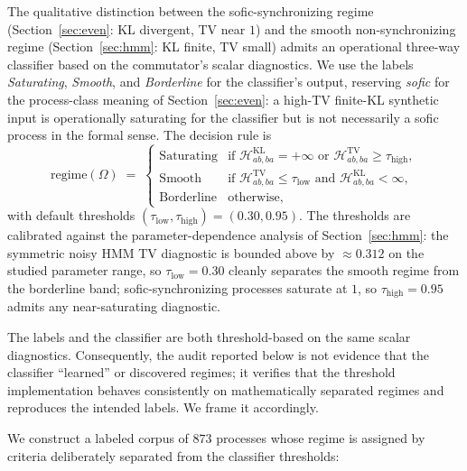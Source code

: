 \documentclass[11pt,a4paper]{article}
\theoremstyle{plain}
\theoremstyle{definition}
\theoremstyle{remark}
\begin{document}
The qualitative distinction between the sofic-synchronizing regime (Section~\ref{sec:even}: KL divergent, TV near $1$) and the smooth non-synchronizing regime (Section~\ref{sec:hmm}: KL finite, TV small) admits an operational three-way classifier based on the commutator's scalar diagnostics. We use the labels \emph{Saturating}, \emph{Smooth}, and \emph{Borderline} for the classifier's output, reserving \emph{sofic} for the process-class meaning of Section~\ref{sec:even}: a high-TV finite-KL synthetic input is operationally saturating for the classifier but is not necessarily a sofic process in the formal sense. The decision rule is
\begin{equation}
\label{eq:classifier}
\mathrm{regime}(\Omega) \;=\;
\begin{cases}
\text{Saturating} & \text{if } \mathcal{H}^{\mathrm{KL}}_{ab,ba} = +\infty \text{ or } \mathcal{H}^{\mathrm{TV}}_{ab,ba} \geq \tau_{\mathrm{high}}, \\
\text{Smooth} & \text{if } \mathcal{H}^{\mathrm{TV}}_{ab,ba} \leq \tau_{\mathrm{low}} \text{ and } \mathcal{H}^{\mathrm{KL}}_{ab,ba} < \infty, \\
\text{Borderline} & \text{otherwise,}
\end{cases}
\end{equation}
with default thresholds $(\tau_{\mathrm{low}}, \tau_{\mathrm{high}}) = (0.30, 0.95)$. The thresholds are calibrated against the parameter-dependence analysis of Section~\ref{sec:hmm}: the symmetric noisy HMM TV diagnostic is bounded above by $\approx 0.312$ on the studied parameter range, so $\tau_{\mathrm{low}} = 0.30$ cleanly separates the smooth regime from the borderline band; sofic-synchronizing processes saturate at $1$, so $\tau_{\mathrm{high}} = 0.95$ admits any near-saturating diagnostic.

The labels and the classifier are both threshold-based on the same scalar diagnostics. Consequently, the audit reported below is not evidence that the classifier ``learned'' or discovered regimes; it verifies that the threshold implementation behaves consistently on mathematically separated regimes and reproduces the intended labels. We frame it accordingly.

We construct a labeled corpus of $873$ processes whose regime is assigned by criteria deliberately separated from the classifier thresholds:
\end{document}
